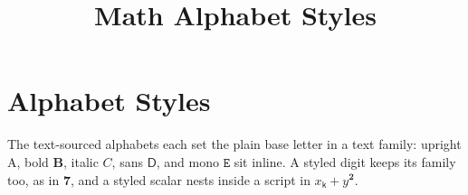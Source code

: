 \documentclass{article}
\title{Math Alphabet Styles}
\begin{document}
\maketitle

\section{Alphabet Styles}

The text-sourced alphabets each set the plain base letter in a text family:
upright $\mathrm{A}$, bold $\mathbf{B}$, italic $\mathit{C}$, sans
$\mathsf{D}$, and mono $\mathtt{E}$ sit inline. A styled digit keeps its
family too, as in $\mathbf{7}$, and a styled scalar nests inside a script
in $x_{\mathsf{k}} + y^{\mathbf{2}}$.
\end{document}
